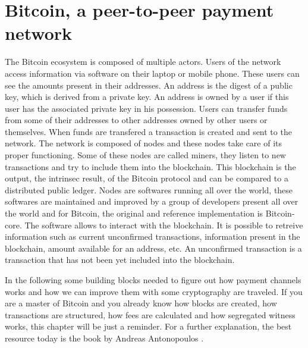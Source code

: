 \chapter{Bitcoin, a peer-to-peer payment network}
\label{chap:bitcoin}

The Bitcoin ecosystem is composed of multiple actors. Users of the network access
information via software on their laptop or mobile phone. These users can see the amounts
present in their addresses. An address is the digest of a public key, which is derived
from a private key. An address is owned by a user if this user
has the associated private key in his possession. Users can transfer funds from some
of their addresses to other addresses owned by other users or themselves. When funds
are transfered a transaction is created and sent to the network. The network is
composed of nodes and these nodes take care of its proper functioning. Some of these
nodes are called miners, they listen to new transactions and try to include them into
the blockchain. This blockchain is the output, the intrinsec result, of the Bitcoin
protocol and can be compared to a distributed public ledger. Nodes are softwares
running all over the world, these softwares are maintained and improved by a group
of developers present all over the world and for Bitcoin, the original and reference
implementation is Bitcoin-core. The software allows to interact with the blockchain.
It is possible to retreive information such as current unconfirmed transactions,
information present in the blockchain, amount available for an address, etc.
An unconfirmed transaction is a transaction that has not been yet included into
the blockchain.

In the following some building blocks needed to figure out how payment channels
works and how we can improve them with some cryptography are traveled. If you
are a master of Bitcoin and you already know how blocks are created, how
transactions are structured, how fees are calculated and how segregated witness
works, this chapter will be just a reminder. For a further explanation, the best
resource today is the book  by Andreas Antonopoulos
\cite{Antonopoulos:2014:MBU:2695500}.


\minitoc

\newpage

